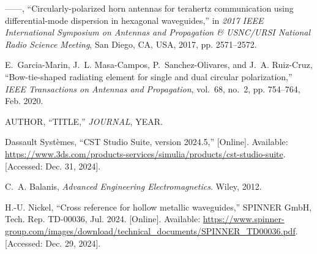 \documentclass[journal]{IEEEtran}
\begin{document}
\begin{thebibliography}{1}
    ------, ``Circularly-polarized horn antennas for terahertz communication using differential-mode dispersion in hexagonal waveguides,'' in \emph{2017 IEEE International Symposium on Antennas and Propagation \& USNC/URSI National Radio Science Meeting}, San Diego, CA, USA, 2017, pp. 2571--2572.
    
    E.~Garcia-Marin, J.~L. Masa-Campos, P.~Sanchez-Olivares, and J.~A. Ruiz-Cruz, ``Bow-tie-shaped radiating element for single and dual circular polarization,'' \emph{IEEE Transactions on Antennas and Propagation}, vol.~68, no.~2, pp. 754--764, Feb. 2020.
    
    AUTHOR, ``TITLE,'' \emph{JOURNAL}, YEAR.

    Dassault Syst{\`e}mes, ``CST Studio Suite, version 2024.5,'' [Online]. Available: \url{https://www.3ds.com/products-services/simulia/products/cst-studio-suite}. [Accessed: Dec. 31, 2024].

    C.~A. Balanis, \emph{Advanced Engineering Electromagnetics}. Wiley, 2012.

    H.-U. Nickel, ``Cross reference for hollow metallic waveguides,'' SPINNER GmbH, Tech. Rep. TD-00036, Jul. 2024. [Online]. Available: \url{https://www.spinner-group.com/images/download/technical_documents/SPINNER_TD00036.pdf}. [Accessed: Dec. 29, 2024].
    
    \end{thebibliography}
\end{document}
